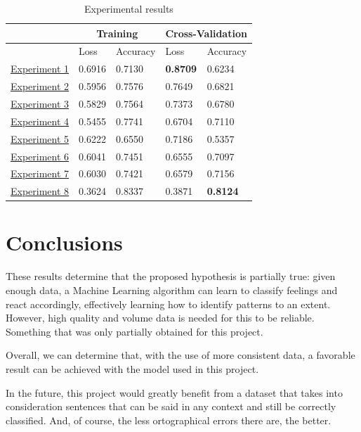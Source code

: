 \documentclass[a4]{sciposter}
\begin{document}
\begin{multicols}{3}
\begin{table}[!h]
	\captionsetup{type=table}
	\setcounter{table}{1}
	\caption{Experimental results}
	\vspace{0.5cm}
	\centering
	\begin{tabular}[t]{|l|l|l|l|l|}
	\hline
	\multicolumn{1}{|c|}{} & \multicolumn{2}{c|}{Training} & \multicolumn{2}{c|}{Cross-Validation}
	\\ \hline
	\ & Loss & Accuracy & Loss & Accuracy
	\\ \hline
	\hyperref[exp1]{Experiment 1} & 0.6916 & 0.7130 & \textbf{0.8709} & 0.6234
	\\ \hline
	\hyperref[exp2]{Experiment 2} & 0.5956 & 0.7576 & 0.7649 & 0.6821
	\\ \hline
	\hyperref[exp3]{Experiment 3} & 0.5829 & 0.7564 & 0.7373 & 0.6780
	\\ \hline
	\hyperref[exp4]{Experiment 4} & 0.5455 & 0.7741 & 0.6704 & 0.7110
	\\ \hline
	\hyperref[exp6]{Experiment 5} & 0.6222 & 0.6550 & 0.7186 & 0.5357
	\\ \hline
	\hyperref[exp7]{Experiment 6} & 0.6041 & 0.7451 & 0.6555 & 0.7097
	\\ \hline
	\hyperref[exp8]{Experiment 7} & 0.6030 & 0.7421 & 0.6579 & 0.7156
	\\ \hline
	\hyperref[exp9]{Experiment 8} & 0.3624 & 0.8337 & 0.3871 & \textbf{0.8124}
	\\ \hline
	\end{tabular}
\end{table}



\section{Conclusions}

These results determine that the proposed hypothesis is partially true: given enough data, a Machine Learning algorithm can learn to classify feelings and react accordingly, effectively learning how to identify patterns to an extent. However, high quality and volume data is needed for this to be reliable. Something that was only partially obtained for this project.

Overall, we can determine that, with the use of more consistent data, a favorable result can be achieved with the model used in this project.

In the future, this project would greatly benefit from a dataset that takes into consideration sentences that can be said in any context and still be correctly classified. And, of course, the less ortographical errors there are, the better.


\end{multicols}
\end{document}
